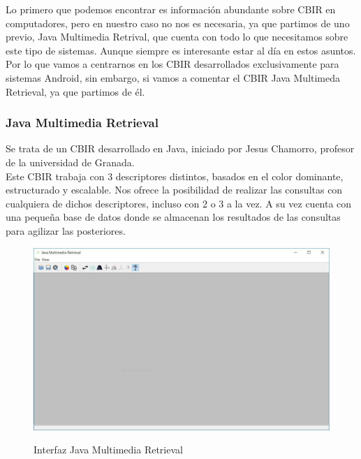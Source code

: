 Lo primero que podemos encontrar es información abundante sobre CBIR en computadores, pero en nuestro caso no nos es necesaria, ya que partimos de uno previo, Java Multimedia Retrival, que cuenta con todo lo que necesitamos sobre este tipo de sistemas. Aunque siempre es interesante estar al día en estos asuntos.\\

Por lo que vamos a centrarnos en los CBIR desarrollados exclusivamente para sistemas Android, sin embargo, si vamos a comentar el CBIR Java Multimeda Retrieval, ya que partimos de él.

\subsubsection{Java Multimedia Retrieval}

Se trata de un CBIR desarrollado en Java, iniciado por Jesus Chamorro, profesor de la universidad de Granada.\\

Este CBIR trabaja con 3 descriptores distintos, basados en el color dominante, estructurado y escalable. Nos ofrece la posibilidad de realizar las consultas con cualquiera de dichos descriptores, incluso con 2 o 3 a la vez. A su vez cuenta con una pequeña base de datos donde se almacenan los resultados de las consultas para agilizar las posteriores.

\begin{figure}[H] %
\centering
\includegraphics[scale=0.5]{imagenes/jmr.jpg}  %
\label{jmr}
\caption{Interfaz Java Multimedia Retrieval}
\end{figure}

